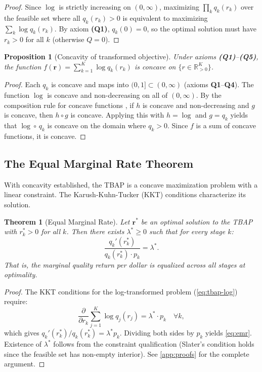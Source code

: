 \documentclass[11pt, a4paper, logo, copyright]{googledeepmind}
\newtheorem{theorem}{Theorem}[section]
\newtheorem{proposition}{Proposition}[section]
\begin{document}
\begin{proof}
Since $\log$ is strictly increasing on $(0, \infty)$, maximizing $\prod_k q_k(r_k)$ over the feasible set where all $q_k(r_k) > 0$ is equivalent to maximizing $\sum_k \log q_k(r_k)$. By axiom \textbf{(Q1)}, $q_k(0) = 0$, so the optimal solution must have $r_k > 0$ for all $k$ (otherwise $Q = 0$).
\end{proof}

\begin{proposition}[Concavity of transformed objective]\label{prop:concavity}
Under axioms \textbf{(Q1)}--\textbf{(Q5)}, the function $f(\mathbf{r}) = \sum_{k=1}^K \log q_k(r_k)$ is concave on $\{r \in \mathbb{R}_{>0}^K\}$.
\end{proposition}

\begin{proof}
Each $q_k$ is concave and maps into $(0,1] \subset (0, \infty)$ (axioms \textbf{Q1}--\textbf{Q4}). The function $\log$ is concave and non-decreasing on all of $(0, \infty)$. By the composition rule for concave functions \citep[Section 3.2.4]{boyd2004}, if $h$ is concave and non-decreasing and $g$ is concave, then $h \circ g$ is concave. Applying this with $h = \log$ and $g = q_k$ yields that $\log \circ\, q_k$ is concave on the domain where $q_k > 0$. Since $f$ is a sum of concave functions, it is concave.
\end{proof}

\subsection{The Equal Marginal Rate Theorem}

With concavity established, the TBAP is a concave maximization problem with a linear constraint. The Karush-Kuhn-Tucker (KKT) conditions characterize its solution.

\begin{theorem}[Equal Marginal Rate]\label{thm:emr}
Let $\mathbf{r}^*$ be an optimal solution to the TBAP with $r_k^* > 0$ for all $k$. Then there exists $\lambda^* \geq 0$ such that for every stage $k$:
\begin{equation}\label{eq:emr}
    \frac{q_k'(r_k^*)}{q_k(r_k^*) \cdot p_k} = \lambda^*.
\end{equation}
That is, the \emph{marginal quality return per dollar} is equalized across all stages at optimality.
\end{theorem}

\begin{proof}
The KKT conditions for the log-transformed problem (\cref{eq:tbap-log}) require:
\[
    \frac{\partial}{\partial r_k} \sum_{j=1}^K \log q_j(r_j) = \lambda^* \cdot p_k \quad \forall k,
\]
which gives $q_k'(r_k^*) / q_k(r_k^*) = \lambda^* p_k$. Dividing both sides by $p_k$ yields \cref{eq:emr}. Existence of $\lambda^*$ follows from the constraint qualification (Slater's condition holds since the feasible set has non-empty interior). See \cref{app:proofs} for the complete argument.
\end{proof}
\end{document}
